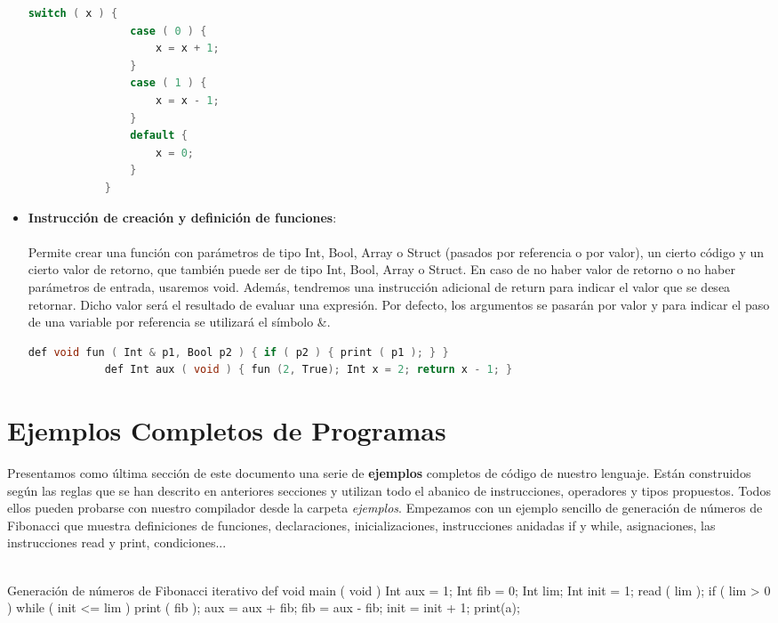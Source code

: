 \documentclass[12pt,onecolumn]{article}
\begin{document}
\begin{itemize}
		\begin{lstlisting}[language=C++, gobble = 10]
			switch ( x ) {
				case ( 0 ) {
					x = x + 1;
				}
				case ( 1 ) {
					x = x - 1;
				}
				default {
					x = 0;
				}	
			}
		\end{lstlisting}
		\bigskip
			\newpage
		\item \textbf{Instrucción de creación y definición de funciones}: \\ \\
		Permite crear una función con parámetros de tipo Int, Bool, Array o Struct (pasados por referencia o por valor), un cierto código y un cierto valor de retorno, que también puede ser de tipo Int, Bool, Array o Struct. En caso de no haber valor de retorno o no haber parámetros de entrada, usaremos void. Además, tendremos una instrucción adicional de return para indicar el valor que se desea retornar. Dicho valor será el resultado de evaluar una expresión. Por defecto, los argumentos se pasarán por valor y para indicar el paso de una variable por referencia se utilizará el símbolo \&.\\
	
		\begin{lstlisting}[language=C++, gobble = 22]
			def void fun ( Int & p1, Bool p2 ) { if ( p2 ) { print ( p1 ); } }
			def Int aux ( void ) { fun (2, True); Int x = 2; return x - 1; }
		\end{lstlisting}
	\end{itemize}
    \section{Ejemplos Completos de Programas}
    
    Presentamos como última sección de este documento una serie de \textbf{ejemplos} completos de código de nuestro lenguaje. Están construidos según las reglas que se han descrito en anteriores secciones y utilizan todo el abanico de instrucciones, operadores y tipos propuestos. Todos ellos pueden probarse con nuestro compilador desde la carpeta \textit{ejemplos}. Empezamos con un ejemplo sencillo de generación de números de Fibonacci que muestra definiciones de funciones, declaraciones, inicializaciones, instrucciones anidadas if y while, asignaciones, las instrucciones read y print, condiciones... \\ \\ 

		\begin{wgetlisting}{Generación de números de Fibonacci iterativo}
def void main ( void ) {
	Int aux = 1; 
  	Int fib = 0;
  	Int lim;
  	Int init = 1;
  	read ( lim );
 	if ( lim > 0 ) {
   		while ( init <= lim ) {
    		     print ( fib );
    		     aux = aux + fib;
    		     fib = aux - fib;
    		     init = init + 1;
		}
  	}
  	print(a);
}
		\end{wgetlisting}
		
\end{document}
